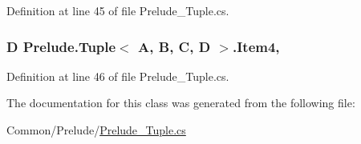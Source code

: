 Definition at line 45 of file Prelude\+\_\+\+Tuple.\+cs.

\hypertarget{class_prelude_1_1_tuple_3_01_a_00_01_b_00_01_c_00_01_d_01_4_aef96d06913b5c331aa2366cfcf237e0c}{
\subsubsection[{Item4}]{\setlength{\rightskip}{0pt plus 5cm}D Prelude.\+Tuple$<$ A, B, C, D $>$.Item4\hspace{0.3cm}{\ttfamily [get]}, {\ttfamily [set]}}}\label{class_prelude_1_1_tuple_3_01_a_00_01_b_00_01_c_00_01_d_01_4_aef96d06913b5c331aa2366cfcf237e0c}


Definition at line 46 of file Prelude\+\_\+\+Tuple.\+cs.



The documentation for this class was generated from the following file\+:\begin{DoxyCompactItemize}
\item 
Common/\+Prelude/\hyperlink{_prelude___tuple_8cs}{Prelude\+\_\+\+Tuple.\+cs}\end{DoxyCompactItemize}
